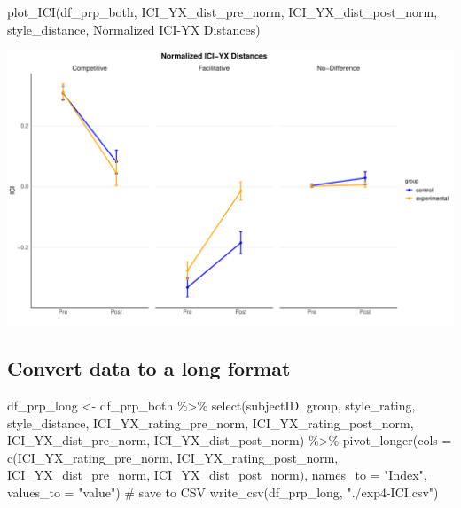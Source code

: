 \documentclass[
  letterpaper,
  DIV=11,
  numbers=noendperiod]{scrartcl}
\newenvironment{Shaded}{\begin{snugshade}}{\end{snugshade}}
\newcommand{\AttributeTok}[1]{\textcolor[rgb]{0.40,0.45,0.13}{#1}}
\newcommand{\CommentTok}[1]{\textcolor[rgb]{0.37,0.37,0.37}{#1}}
\newcommand{\FunctionTok}[1]{\textcolor[rgb]{0.28,0.35,0.67}{#1}}
\newcommand{\NormalTok}[1]{\textcolor[rgb]{0.00,0.23,0.31}{#1}}
\newcommand{\OtherTok}[1]{\textcolor[rgb]{0.00,0.23,0.31}{#1}}
\newcommand{\SpecialCharTok}[1]{\textcolor[rgb]{0.37,0.37,0.37}{#1}}
\newcommand{\StringTok}[1]{\textcolor[rgb]{0.13,0.47,0.30}{#1}}
\begin{document}
\begin{Shaded}
\begin{Highlighting}[]
\FunctionTok{plot\_ICI}\NormalTok{(df\_prp\_both, }\StringTok{\textquotesingle{}ICI\_YX\_dist\_pre\_norm\textquotesingle{}}\NormalTok{, }\StringTok{\textquotesingle{}ICI\_YX\_dist\_post\_norm\textquotesingle{}}\NormalTok{, }\StringTok{\textquotesingle{}style\_distance\textquotesingle{}}\NormalTok{, }\StringTok{\textquotesingle{}Normalized ICI{-}YX Distances\textquotesingle{}}\NormalTok{)}
\end{Highlighting}
\end{Shaded}

\includegraphics{index_files/figure-pdf/unnamed-chunk-44-2.pdf}

\subsection{Convert data to a long
format}\label{convert-data-to-a-long-format}

\begin{Shaded}
\begin{Highlighting}[]
\NormalTok{df\_prp\_long }\OtherTok{\textless{}{-}}\NormalTok{ df\_prp\_both }\SpecialCharTok{\%\textgreater{}\%}
  \FunctionTok{select}\NormalTok{(subjectID, group, style\_rating, style\_distance, ICI\_YX\_rating\_pre\_norm, ICI\_YX\_rating\_post\_norm, ICI\_YX\_dist\_pre\_norm, ICI\_YX\_dist\_post\_norm) }\SpecialCharTok{\%\textgreater{}\%}
  \FunctionTok{pivot\_longer}\NormalTok{(}\AttributeTok{cols =} \FunctionTok{c}\NormalTok{(ICI\_YX\_rating\_pre\_norm, ICI\_YX\_rating\_post\_norm, ICI\_YX\_dist\_pre\_norm, ICI\_YX\_dist\_post\_norm), }\AttributeTok{names\_to =} \StringTok{"Index"}\NormalTok{, }\AttributeTok{values\_to =} \StringTok{"value"}\NormalTok{) }
\CommentTok{\# save to CSV}
\FunctionTok{write\_csv}\NormalTok{(df\_prp\_long, }\StringTok{"./exp4{-}ICI.csv"}\NormalTok{)}
\end{Highlighting}
\end{Shaded}
\end{document}
